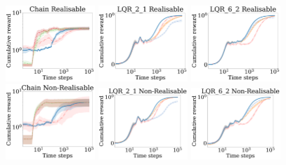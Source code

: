 \setlength{\textfloatsep}{4pt}%
\begin{figure}[t!]
    \centering
    \includegraphics[width=0.3\textwidth]{img/chain_realisable.pdf}         
    \includegraphics[width=0.3\textwidth]{img/lqr_2_1_realisable.pdf} 
    \includegraphics[width=0.3\textwidth]{img/lqr_6_2_realisable.pdf}\\
    \includegraphics[width=0.3\textwidth]{img/chain_non_realisable.pdf}        
    \includegraphics[width=0.3\textwidth]{img/lqr_2_1_non_realisable.pdf} 
    \includegraphics[width=0.3\textwidth]{img/lqr_6_2_non_realisable.pdf}\\

\end{figure}
